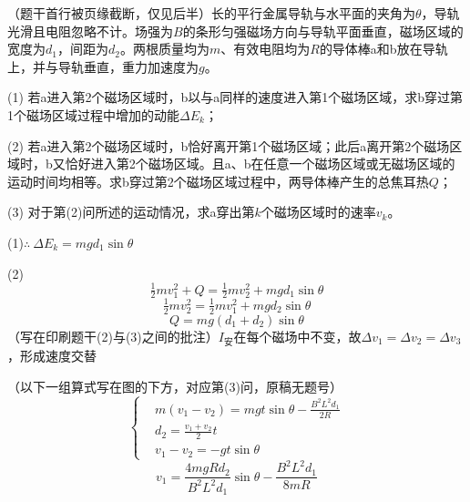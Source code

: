 \begin{problem}
（题干首行被页缘截断，仅见后半）长的平行金属导轨与水平面的夹角为$\theta$，导轨光滑且电阻忽略不计。场强为$B$的条形匀强磁场方向与导轨平面垂直，磁场区域的宽度为$d_1$，间距为$d_2$。两根质量均为$m$、有效电阻均为$R$的导体棒a和b放在导轨上，并与导轨垂直，重力加速度为$g$。

(1) 若a进入第2个磁场区域时，b以与a同样的速度进入第1个磁场区域，求b穿过第1个磁场区域过程中增加的动能$\Delta E_k$；

(2) 若a进入第2个磁场区域时，b恰好离开第1个磁场区域；此后a离开第2个磁场区域时，b又恰好进入第2个磁场区域。且a、b在任意一个磁场区域或无磁场区域的运动时间均相等。求b穿过第2个磁场区域过程中，两导体棒产生的总焦耳热$Q$；

(3) 对于第(2)问所述的运动情况，求a穿出第$k$个磁场区域时的速率$v_k$。

\begin{solution}
(1)\quad $\therefore\ \Delta E_k=mgd_1\sin\theta$

(2)
\[ \tfrac12mv_1^2+Q=\tfrac12mv_2^2+mgd_1\sin\theta \]
\[ \tfrac12mv_2^2=\tfrac12mv_1^2+mgd_2\sin\theta \] %
\[ Q=mg(d_1+d_2)\sin\theta \]
（写在印刷题干(2)与(3)之间的批注）$I_{\text{安}}$在每个磁场中不变，故$\Delta v_1=\Delta v_2=\Delta v_3$，形成速度交替

（以下一组算式写在图的下方，对应第(3)问，原稿无题号）
\[
\left\{\begin{aligned}
&m(v_1-v_2)=mgt\sin\theta-\frac{B^2L^2d_1}{2R}\\
&d_2=\frac{v_1+v_2}{2}t\\
&v_1-v_2=-gt\sin\theta
\end{aligned}\right.
\]
\[ v_1=\frac{4mgRd_2}{B^2L^2d_1}\sin\theta-\frac{B^2L^2d_1}{8mR} \]
\end{solution}
\end{problem}
